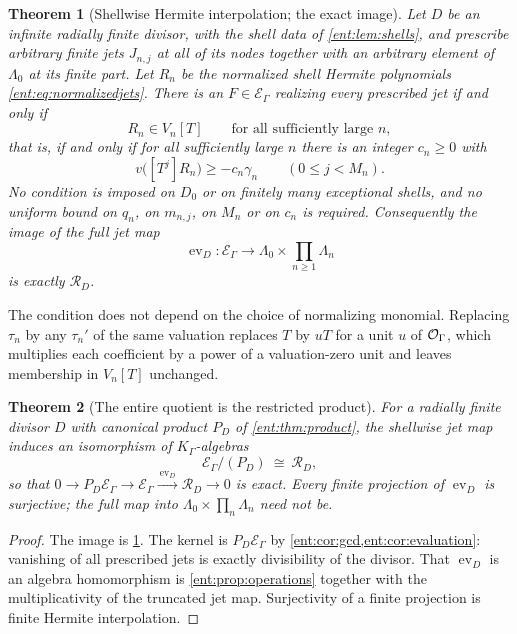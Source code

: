 \documentclass[11pt]{article}
\newtheorem{theorem}{Theorem}[section]
\theoremstyle{plain}
\theoremstyle{plain}
\theoremstyle{plain}
\theoremstyle{definition}
\theoremstyle{definition}
\theoremstyle{definition}
\theoremstyle{definition}
\theoremstyle{remark}
\newcommand{\K}{K_\Gamma}\newcommand{\KD}{K_\Delta}
\newcommand{\E}{\mathcal E_\Gamma}
\DeclareMathOperator{\ev}{ev}
\newcommand{\RD}{\mathcal R_D}\newcommand{\Ucal}{\mathcal U}
\begin{document}
\begin{theorem}[Shellwise Hermite interpolation; the exact image]
\label{ent:thm:image}
Let $D$ be an infinite radially finite divisor, with the shell data of
\cref{ent:lem:shells}, and prescribe arbitrary finite jets $J_{n,j}$ at all of
its nodes together with an arbitrary element of $\Lambda_0$ at its finite
part. Let $R_n$ be the normalized shell Hermite polynomials
\eqref{ent:eq:normalizedjets}. There is an $F\in\E$ realizing every
prescribed jet if and only if
\begin{equation}\label{ent:eq:maincondition}
 R_n\in V_n[T]\qquad\text{for all sufficiently large }n,
\end{equation}
that is, if and only if for all sufficiently large $n$ there is an integer
$c_n\ge0$ with
\[
 v\bigl([T^j]R_n\bigr)\ge-c_n\gamma_n\qquad(0\le j<M_n).
\]
No condition is imposed on $D_0$ or on finitely many exceptional shells, and
no uniform bound on $q_n$, on $m_{n,j}$, on $M_n$ or on $c_n$ is required.
Consequently the image of the full jet map
\[
 \ev_D:\E\longrightarrow
 \Lambda_0\times\prod_{n\ge1}\Lambda_n
\]
is exactly $\RD$.
\end{theorem}

The condition does not depend on the choice of normalizing monomial.
Replacing $\tau_n$ by any $\tau_n'$ of the same valuation replaces $T$ by
$uT$ for a unit $u$ of $\mathcal O_\Gamma$, which multiplies each coefficient by a power of
a valuation-zero unit and leaves membership in $V_n[T]$ unchanged.

\begin{theorem}[The entire quotient is the restricted product]
\label{ent:thm:quotient}
For a radially finite divisor $D$ with canonical product $P_D$ of
\cref{ent:thm:product}, the shellwise jet map induces an isomorphism of
$\K$-algebras
\[
 \E/(P_D)\ \cong\ \RD,
\]
so that
$0\to P_D\E\to\E\xrightarrow{\ \ev_D\ }\RD\to0$
is exact. Every finite projection of $\ev_D$ is surjective; the full map into
$\Lambda_0\times\prod_n\Lambda_n$ need not be.
\end{theorem}
\begin{proof}
The image is \cref{ent:thm:image}. The kernel is $P_D\E$ by
\cref{ent:cor:gcd,ent:cor:evaluation}: vanishing of all prescribed jets is
exactly divisibility of the divisor. That $\ev_D$ is an algebra homomorphism
is \cref{ent:prop:operations} together with the multiplicativity of the
truncated jet map. Surjectivity of a finite projection is finite Hermite
interpolation.
\end{proof}
\end{document}
